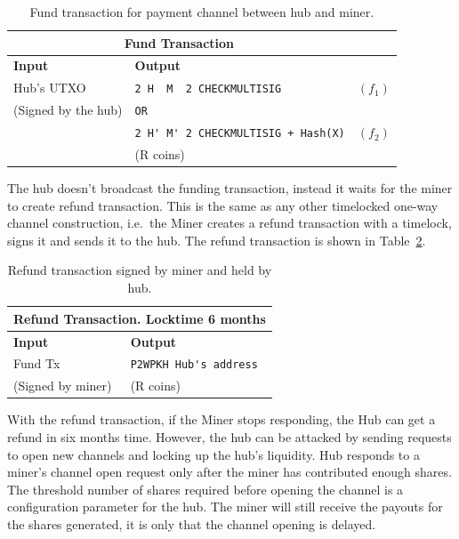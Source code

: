 \documentclass{article}
\begin{document}
\begin{table}
  \centering
  \begin{tabular}{ llr }
    \multicolumn{2}{c}{\bfseries Fund Transaction} \\
    \midrule
    \bfseries Input & \bfseries Output \\
    \midrule
    Hub's UTXO & \verb|2 H  M  2 CHECKMULTISIG| & $(f_1)$ \\
    (Signed by the hub) & \verb|OR| \\
                    & \verb|2 H' M' 2 CHECKMULTISIG + Hash(X)| & $(f_2)$ \\
    & (R coins) \\
    \midrule
  \end{tabular}
  \caption{Fund transaction for payment channel between hub and miner.}\label{fund-tx}
\end{table}


The hub doesn't broadcast the funding transaction, instead it waits
for the miner to create refund transaction. This is the same as any
other timelocked one-way channel construction, i.e.\ the Miner creates
a refund transaction with a timelock, signs it and sends it to the
hub. The refund transaction is shown in Table~\ref{refund-tx}.

\begin{table}
  \centering
  \begin{tabular}{ ll }
    \multicolumn{2}{c}{\bfseries Refund Transaction. Locktime 6 months} \\
    \midrule
    \bfseries Input & \bfseries Output \\
    \midrule
    Fund Tx & \verb|P2WPKH Hub's address| \\
    (Signed by miner) & (R coins) \\
    \midrule
  \end{tabular}
  \caption{Refund transaction signed by miner and held by
    hub.}\label{refund-tx}
\end{table}

With the refund transaction, if the Miner stops responding, the Hub
can get a refund in six months time. However, the hub can be attacked
by sending requests to open new channels and locking up the hub's
liquidity. Hub responds to a miner's channel open request only after
the miner has contributed enough shares. The threshold number of
shares required before opening the channel is a configuration
parameter for the hub. The miner will still receive the payouts for
the shares generated, it is only that the channel opening is delayed.
\end{document}
